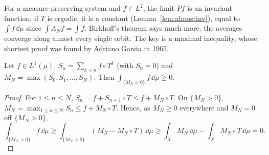 For a measure-preserving system and $f\in L^2$, the limit $Pf$ is an invariant function; if $T$ is ergodic, it is a constant (Lemma~\ref{lem:almostinv}), equal to $\int f\,\dd\mu$ since $\int A_Nf=\int f$.
Birkhoff's theorem says much more: the averages converge along almost every single orbit. The key is a maximal inequality, whose shortest proof was found by Adriano Garsia in 1965.

\begin{lemma}\label{lem:maxergodic}
Let $f\in L^1(\mu)$, $S_n=\sum_{k<n}f\circ T^k$ (with $S_0=0$) and $M_N=\max(S_0,S_1,\dots,S_N)$. Then $\int_{\{M_N>0\}}f\,\dd\mu\ge0$.
\end{lemma}
\begin{proof}
For $1\le n\le N$, $S_n=f+S_{n-1}\circ T\le f+M_N\circ T$. On $\{M_N>0\}$, $M_N=\max_{1\le n\le N}S_n\le f+M_N\circ T$. Hence, as $M_N\ge0$ everywhere and $M_N=0$ off $\{M_N>0\}$,
\[
\int_{\{M_N>0\}}f\,\dd\mu\ge\int_{\{M_N>0\}}(M_N-M_N\circ T)\,\dd\mu\ge\int_XM_N\,\dd\mu-\int_XM_N\circ T\,\dd\mu=0.
\]
\end{proof}

